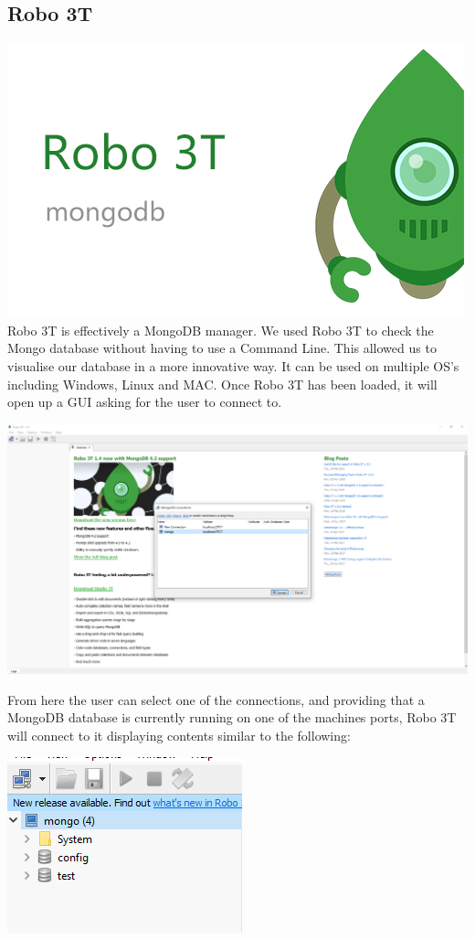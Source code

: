 \subsection{Robo 3T}
\includegraphics[scale=0.6]{img/robo-logo.png}\newline
Robo 3T is effectively a MongoDB manager. We used Robo 3T to check the Mongo database without having to use a Command Line. This allowed us to visualise our database in a more innovative way. It can be used on multiple OS's including Windows, Linux and MAC. Once Robo 3T has been loaded, it will open up a GUI asking for the user to connect to. \par
\includegraphics[scale=0.3]{img/robo-connect.PNG}\par
From here the user can select one of the connections, and providing that a MongoDB database is currently running on one of the machines ports, Robo 3T will connect to it displaying contents similar to the following: \par
\includegraphics[]{img/robo-contents.PNG} \par

